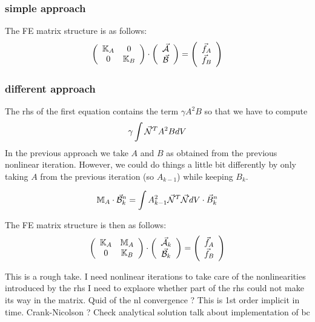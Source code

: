 \subsubsection*{simple approach} The FE matrix structure is as follows:
\[
\left(
\begin{array}{cc}
{\mathbb{K}}_A & 0 \\
0 & {\mathbb{K}}_B
\end{array}
\right)
\cdot
\left(
\begin{array}{c}
\vec{\cal A}\\
\vec{\cal B}
\end{array}
\right)
=
\left(
\begin{array}{c}
\vec{f}_A\\
\vec{f}_B
\end{array}
\right)
\]


\subsubsection*{different approach} The rhs of the first equation contains the term $\gamma A^2B$
so that we have to compute
\[
\gamma \int \vec{\cal N}^T A^2 B dV
\]
In the previous approach we take $A$ and $B$ as obtained from the previous nonlinear iteration. 
However, we could do things a little bit differently by only taking $A$ from the previous iteration (so $A_{k-1}$)
while keeping $B_{k}$.

\[
{\mathbb{M}}_A \cdot \vec{\cal B}^n_k =  \int A_{k-1}^2 \vec{{\mathcal{N}}}^T \vec{{\mathcal{N}}} dV  \cdot \vec{B}_k^n
\]


The FE matrix structure is then as follows:
\[
\left(
\begin{array}{cc}
{\mathbb{K}}_A & {\mathbb{M}}_A \\
0 & {\mathbb{K}}_B
\end{array}
\right)
\cdot
\left(
\begin{array}{c}
\vec{\cal A}_k\\
\vec{\cal B}_k
\end{array}
\right)
=
\left(
\begin{array}{c}
\vec{f}_A\\
\vec{f}_B
\end{array}
\right)
\]




\newpage

This is a rough take.
I need nonlinear iterations to take care of the nonlinearities introduced by the rhs
I need to explaore whether part of the rhs could not make its way in the matrix. 
Quid of the nl convergence ?
This is 1st order implicit in time. Crank-Nicolson ?
Check analytical solution 
talk about implementation of bc

